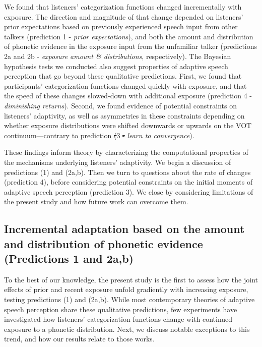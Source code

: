 \documentclass[
  11pt,
  man,mask,floatsintext]{apa6}
\makeatletter
\providecommand{\DIFadd}[1]{{\protect\color{blue}\uwave{#1}}} %
\providecommand{\DIFdel}[1]{{\protect\color{red}\sout{#1}}} %
\providecommand{\DIFaddbegin}{} %
\providecommand{\DIFaddend}{} %
\providecommand{\DIFdelbegin}{} %
\providecommand{\DIFdelend}{} %
\newcommand{\DIFscaledelfig}{0.5}
\newlength{\DIFdelgraphicswidth} %
\newlength{\DIFdelgraphicsheight} %
\newcommand{\DIFaddincludegraphics}[2][]{{\color{blue}\fbox{\DIFOincludegraphics[#1]{#2}}}} %
\newcommand{\DIFdelincludegraphics}[2][]{%
\sbox{\DIFdelgraphicsbox}{\DIFOincludegraphics[#1]{#2}}%
\settoboxwidth{\DIFdelgraphicswidth}{\DIFdelgraphicsbox} %
\settoboxtotalheight{\DIFdelgraphicsheight}{\DIFdelgraphicsbox} %
\scalebox{\DIFscaledelfig}{%
\parbox[b]{\DIFdelgraphicswidth}{\usebox{\DIFdelgraphicsbox}\\[-\baselineskip] \rule{\DIFdelgraphicswidth}{0em}}\llap{\resizebox{\DIFdelgraphicswidth}{\DIFdelgraphicsheight}{%
\setlength{\unitlength}{\DIFdelgraphicswidth}%
\begin{picture}(1,1)%
\thicklines\linethickness{2pt} %
{\color[rgb]{1,0,0}\put(0,0){\framebox(1,1){}}}%
{\color[rgb]{1,0,0}\put(0,0){\line( 1,1){1}}}%
{\color[rgb]{1,0,0}\put(0,1){\line(1,-1){1}}}%
\end{picture}%
}\hspace*{3pt}}} %
} %
\DeclareRobustCommand{\DIFaddbegin}{\DIFOaddbegin \let\includegraphics\DIFaddincludegraphics} %
\DeclareRobustCommand{\DIFaddend}{\DIFOaddend \let\includegraphics\DIFOincludegraphics} %
\DeclareRobustCommand{\DIFdelbegin}{\DIFOdelbegin \let\includegraphics\DIFdelincludegraphics} %
\DeclareRobustCommand{\DIFdelend}{\DIFOaddend \let\includegraphics\DIFOincludegraphics} %
\let\sout@orig\sout %
\renewcommand{\sout}[1]{\ifmmode\text{\sout@orig{\ensuremath{#1}}}\else\sout@orig{#1}\fi} %
\makeatother
\begin{document}
We found that listeners' categorization functions changed incrementally with exposure. The direction and magnitude of that change depended on listeners' prior expectations based on previously experienced speech input from other talkers (prediction 1 - \emph{prior expectations}), and both the amount and distribution of phonetic evidence in the exposure input from the unfamiliar talker (predictions 2a and 2b - \emph{exposure amount \& distributions}, respectively). The Bayesian hypothesis tests we conducted also suggest properties of adaptive speech perception that go beyond these qualitative predictions. First, we found that participants' categorization functions changed quickly with exposure, and that the speed of these changes slowed-down with additional exposure (prediction 4 - \emph{diminishing returns}). Second, we found evidence of potential constraints on listeners' adaptivity, as well as asymmetries in these constraints depending on whether exposure distributions were shifted downwards or upwards on the VOT continuum---contrary to prediction \DIFdelbegin \DIFdel{(}\DIFdelend 3 \DIFdelbegin \DIFdel{- }\DIFdelend \DIFaddbegin \DIFadd{(}\DIFaddend \emph{learn to convergence}).

These findings inform theory by characterizing the computational properties of the mechanisms underlying listeners' adaptivity. We begin a discussion of predictions (1) and (2a,b). Then we turn to questions about the rate of changes (prediction 4), before considering potential constraints on the initial moments of adaptive speech perception (prediction 3). We close by considering limitations of the present study and how future work can overcome them.

\subsection{Incremental adaptation based on the amount and distribution of phonetic evidence (Predictions 1 and 2a,b)}\label{incremental-adaptation-based-on-the-amount-and-distribution-of-phonetic-evidence-predictions-1-and-2ab}

To the best of our knowledge, the present study is the first to assess how the joint effects of prior and recent exposure unfold gradiently with increasing exposure, testing predictions (1) and (2a,b). While most contemporary theories of adaptive speech perception share these qualitative predictions, few experiments have investigated how listeners' categorization functions change with continued exposure to a phonetic distribution. Next, we discuss notable exceptions to this trend, and how our results relate to those works.
\end{document}
